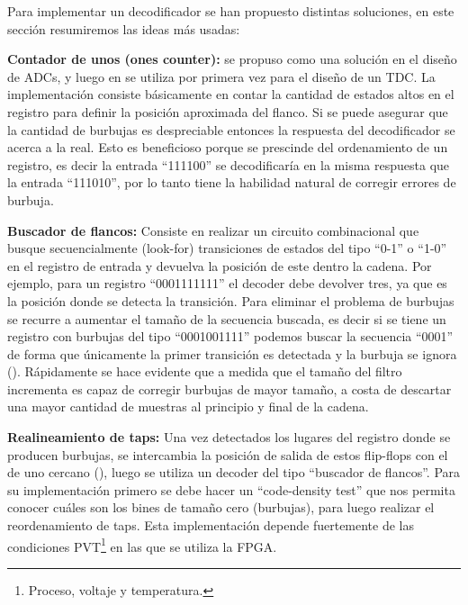 Para implementar un decodificador se han propuesto distintas soluciones, en este sección resumiremos las ideas más usadas:
\begin{bangenumerate}
     \item \textbf{Contador de unos (ones counter):} se propuso como una solución en el diseño de ADCs, y luego en \cite{wang_39-ps_2017} se utiliza por primera vez
     para el diseño de un TDC. La implementación consiste básicamente en contar la cantidad de estados altos en el registro para definir la posición aproximada del flanco. 
     Si se puede asegurar que la cantidad de burbujas es despreciable entonces la respuesta del decodificador se acerca a la real. Esto es beneficioso porque 
     se prescinde del ordenamiento de un registro, es decir la entrada ``111100'' se decodificaría en la misma respuesta que la entrada ``111010'', por lo tanto
     tiene la habilidad natural de corregir errores de burbuja.

     \item \textbf{Buscador de flancos:} Consiste en realizar un circuito combinacional que busque secuencialmente (look-for) transiciones de estados del tipo ``0-1'' o ``1-0'' en el
     registro de entrada y devuelva la posición de este dentro la cadena. Por ejemplo, para un registro ``0001111111'' el decoder debe devolver tres, ya que es la
     posición donde se detecta la transición. Para eliminar el problema de burbujas se recurre a aumentar el tamaño de la secuencia buscada,
     es decir si se tiene un registro con burbujas del tipo ``0001001111'' podemos buscar la secuencia ``0001'' de forma que únicamente la primer transición es detectada
     y la burbuja se ignora (\cite{Wu2010}). Rápidamente se hace evidente que a medida que el tamaño del filtro incrementa es capaz de corregir burbujas
     de mayor tamaño, a costa de descartar una mayor cantidad de muestras al principio y final de la cadena.
     
     
     \item \textbf{Realineamiento de taps:} Una vez detectados los lugares del registro donde se producen burbujas, se intercambia la posición de salida
     de estos flip-flops con el de uno cercano (\cite{Liu2015}), luego se utiliza un decoder del tipo ``buscador de flancos''. Para su implementación primero
     se debe hacer un ``code-density test'' que nos permita conocer cuáles son los bines de tamaño cero (burbujas), para luego realizar el reordenamiento de taps. Esta
     implementación depende fuertemente de las condiciones PVT\footnote{Proceso, voltaje y temperatura.} en las que se utiliza la FPGA.
\end{bangenumerate}

